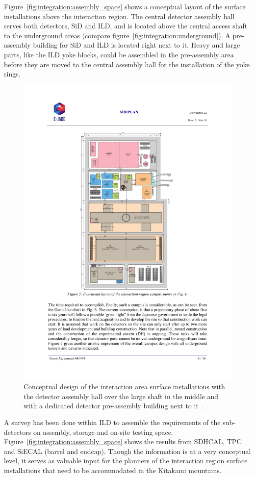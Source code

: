 Figure~\ref{fig:integration:assembly_space} shows a conceptual layout of the surface installations above the interaction region. The central detector assembly hall serves both detectors, SiD and ILD, and is located above the central access shaft to the underground areas (compare figure~\ref{fig:integration:underground}). A pre-assembly building for SiD and ILD is located right next to it. Heavy and large parts, like the ILD yoke blocks, could be assembled in the pre-assembly area before they are moved to the central assembly hall for the installation of the yoke rings.
\begin{figure}[p]
\centering
\includegraphics[width=0.8\hsize]{Integration/fig/interaction_area.pdf}
\caption{\label{fig:integration:interaction_area}Conceptual design of the interaction area surface installations with the detector assembly hall over the large shaft in the middle and with a dedicated detector pre-assembly building next to it~\cite{ild:bib:ejade_mdi}.}
\end{figure}
A survey has been done within ILD to assemble the requirements of the sub-detectors on assembly, storage and on-site testing space. Figure~\ref{fig:integration:assembly_space} shows the results from SDHCAL, TPC and SiECAL (barrel and endcap). Though the information is at a very conceptual level, it serves as valuable input for the planners of the interaction region surface installations that need to be accommodated in the Kitakami mountains.
